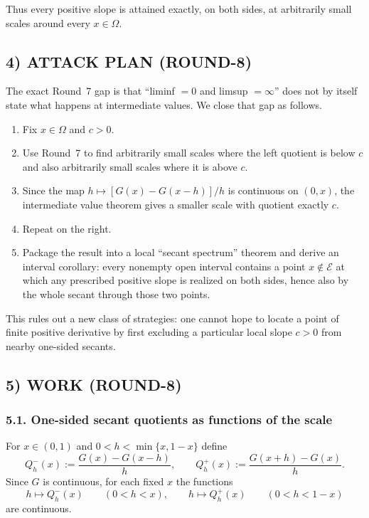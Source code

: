 Thus every positive slope is attained exactly, on both sides, at arbitrarily small scales around every $x\in\Omega$.

\subsection{4) ATTACK PLAN (ROUND-8)}

The exact Round~7 gap is that ``liminf $=0$ and limsup $=\infty$'' does not by itself state what happens at intermediate values. We close that gap as follows.

\begin{enumerate}
\item Fix $x\in\Omega$ and $c>0$.
\item Use Round~7 to find arbitrarily small scales where the left quotient is below $c$ and also arbitrarily small scales where it is above $c$.
\item Since the map $h\mapsto [G(x)-G(x-h)]/h$ is continuous on $(0,x)$, the intermediate value theorem gives a smaller scale with quotient exactly $c$.
\item Repeat on the right.
\item Package the result into a local ``secant spectrum'' theorem and derive an interval corollary: every nonempty open interval contains a point $x\notin\mathcal E$ at which any prescribed positive slope is realized on both sides, hence also by the whole secant through those two points.
\end{enumerate}

This rules out a new class of strategies: one cannot hope to locate a point of finite positive derivative by first excluding a particular local slope $c>0$ from nearby one-sided secants.

\subsection{5) WORK (ROUND-8)}

\subsubsection*{5.1. One-sided secant quotients as functions of the scale}

For $x\in(0,1)$ and $0<h<\min\{x,1-x\}$ define
\[
Q_h^-(x):=\frac{G(x)-G(x-h)}{h},
\qquad
Q_h^+(x):=\frac{G(x+h)-G(x)}{h}.
\]
Since $G$ is continuous, for each fixed $x$ the functions
\[
h\longmapsto Q_h^-(x)\qquad(0<h<x),
\qquad
h\longmapsto Q_h^+(x)\qquad(0<h<1-x)
\]
are continuous.

